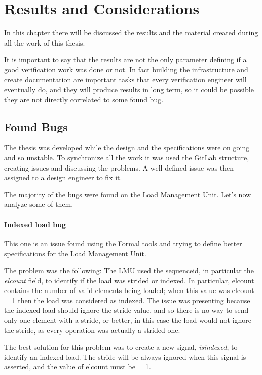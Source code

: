 \chapter{Results and Considerations}
In this chapter there will be discussed the results and the material created during all the work of this thesis.

It is important to say that the results are not the only parameter defining if a good verification work was done or not. In fact building the infrastructure and create documentation are important tasks that every verification engineer will eventually do, and they will produce results in long term, so it could be possible they are not directly correlated to some found bug.


\section{Found Bugs}
The thesis was developed while the design and the specifications were on going and so unstable. To synchronize all the work it was used the GitLab structure, creating issues and discussing the problems. A well defined issue was then assigned to a design engineer to fix it.

The majority of the bugs were found on the Load Management Unit. Let's now analyze some of them.

\subsubsection{Indexed load bug}
This one is an issue found using the Formal tools and trying to define better specifications for the Load Management Unit.

The problem was the following:
The LMU used the sequence\+id, in particular the \emph{el\+count} field, to identify if the load was strided or indexed. In particular, el\+count contains the number of valid elements being loaded; when this value was el\+count = 1 then the load was considered as indexed.
The issue was presenting because the indexed load should ignore the stride value, and so there is no way to send only one element with a stride, or better, in this case the load would not ignore the stride, as every operation was actually a strided one.

The best solution for this problem was to create a new signal, \emph{is\+indexed}, to identify an indexed load. The stride will be always ignored when this signal is asserted, and the value of el\+count must be = 1.

